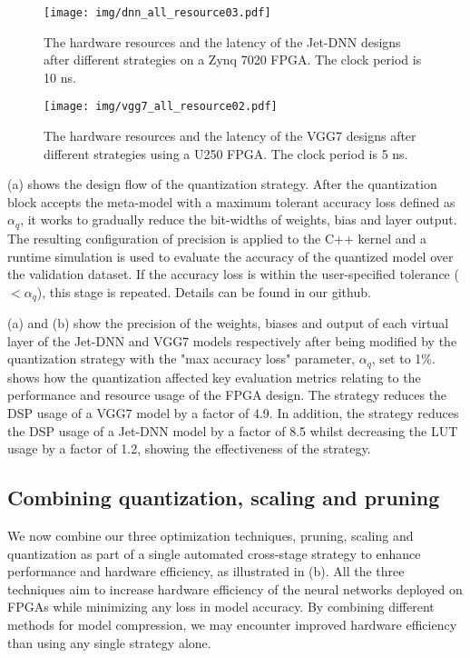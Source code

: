 \begin{figure}%
   \centering
    \texttt{[image: img/dnn\_all\_resource03.pdf]} 
  \caption{ The hardware resources and the latency of the Jet-DNN designs after different strategies on a Zynq 7020 FPGA. The clock period is 10 ns.  }
  \label{fig:dnn_all_resource} 
\end{figure}

\begin{figure}%
   \centering
    \texttt{[image: img/vgg7\_all\_resource02.pdf]} 
  \caption{ The hardware resources and the latency of the VGG7 designs after different strategies using a U250 FPGA. The clock period is 5 ns.  }
  \label{fig:vgg7_all_resource} 
\end{figure}




(a) shows the design flow of the quantization strategy. After the quantization block accepts the meta-model with a maximum tolerant accuracy loss defined as $\alpha_q$, it works to gradually reduce the bit-widths of weights, bias and layer output. The resulting configuration of precision is applied to the C++ kernel and a runtime simulation is used to evaluate the accuracy of the quantized model over the validation dataset. If the accuracy loss is within the user-specified tolerance ($< \alpha_q$), this stage is repeated. Details can be found in our github. 


(a) and (b) show the precision of the weights, biases and output of each virtual layer of the Jet-DNN and VGG7 models respectively after being modified by the quantization strategy with the "max accuracy loss" parameter, $\alpha_q$, set to 1\%.  shows how the quantization affected key evaluation metrics relating to the performance and resource usage of the FPGA design. The strategy reduces the DSP usage of a VGG7 model by a factor of 4.9. In addition, the strategy reduces the DSP usage of a Jet-DNN model by a factor of 8.5 whilst decreasing the LUT usage by a factor of 1.2, showing the effectiveness of the strategy. 


\subsection{Combining quantization, scaling and pruning}\label{sec:all_three}
We now combine our three optimization techniques, pruning, scaling and quantization as part of a single automated cross-stage strategy to enhance performance and hardware efficiency, as illustrated in (b). All the three techniques aim to increase hardware efficiency of the neural networks deployed on FPGAs while minimizing any loss in model accuracy. By combining different methods for model compression, we may encounter improved hardware efficiency than using any single strategy alone. 

